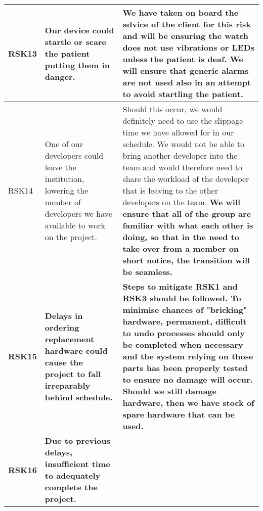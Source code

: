 \begin{xltabular}[H]{1.4\textwidth}{p{0.1\textwidth} | p{0.4\textwidth} | p{0.9\textwidth}}
    \midrule

    RSK13

    &

    Our device could startle or scare the patient putting them in danger.

    &

    We have taken on board the advice of the client for this risk and will be ensuring the watch does not use vibrations or LEDs unless the patient is deaf. We will ensure that generic alarms are not used also in an attempt to avoid startling the patient.\\

    \midrule

    RSK14

    &

    One of our developers could leave the institution, lowering the number of developers we have available to work on the project.

    &

    Should this occur, we would definitely need to use the slippage time we have allowed for in our schedule. We would not be able to bring another developer into the team and would therefore need to share the workload of the developer that is leaving to the other developers on the team. \textbf{We will ensure that all of the group are familiar with what each other is doing, so that in the need to take over from a member on short notice, the transition will be seamless.}\\
    
    \midrule

    \textbf{RSK15}

    &

    \textbf{Delays in ordering replacement hardware could cause the project to fall irreparably behind schedule.}

    &

    \textbf{Steps to mitigate RSK1 and RSK3 should be followed. To minimise chances of "bricking" hardware, permanent, difficult to undo processes should only be completed when necessary and the system relying on those parts has been properly tested to ensure no damage will occur. Should we still damage hardware, then we have stock of spare hardware that can be used.} \\
   
    \midrule

    \textbf{RSK16}

    &

    \textbf{Due to previous delays, insufficient time to adequately complete the project.}


\end{xltabular}
